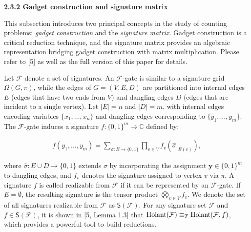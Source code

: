 



\par\medskip\noindent\textbf{
2.3.2 Gadget construction and signature matrix}\par




This subsection introduces two principal concepts in the study of counting problems: \emph{gadget construction} and the \emph{signature matrix}. Gadget construction is a critical reduction technique, and the signature matrix provides an algebraic representation bridging gadget construction with matrix multiplication. Please refer to [5] as well as the full version of this paper for details.\par




Let $\mathcal{F}$ denote a set of signatures. An $\mathcal{F}$-gate is similar to a signature grid $\Omega(G,\pi)$, while the edges of $G=(V,E,D)$ are partitioned into internal edges $E$ (edges that have two ends from $V$) and dangling edges $D$ (edges that are incident to a single vertex). Let $|E|=n$ and $|D|=m$, with internal edges encoding variables $\{x_{1},\ldots,x_{n}\}$ and dangling edges corresponding to $\{y_{1},\ldots,y_{m}\}$. The $\mathcal{F}$-gate induces a signature $f:\{0,1\}^{m}\to\mathbb{C}$ defined by:\par


\[\begin{gathered}
f(y_{1},\ldots,y_{m})=\sum_{\sigma:E\to\{0,1\}}\prod_{v\in V}f_{v}\left(\hat{\sigma}|_{E(v)}\right),
\end{gathered}\]


where $\hat{\sigma}:E\cup D\to\{0,1\}$ extends $\sigma$ by incorporating the assignment $\mathbf{y}\in\{0,1\}^{m}$ to dangling edges, and $f_{v}$ denotes the signature assigned to vertex $v$ via $\pi$. A signature $f$ is called realizable from $\mathcal{F}$ if it can be represented by an $\mathcal{F}$-gate. If $E=\emptyset$, the resulting signature is the tensor product $\bigotimes_{v\in V}f_{v}$. We denote the set of all signatures realizable from $\mathcal{F}$ as $\textsf{S}(\mathcal{F})$.
For any signature set $\mathcal{F}$ and $f\in\textsf{S}(\mathcal{F})$, it is shown in [5, Lemma 1.3] that $\textup{{Holant}}(\mathcal{F})\equiv_{T}\textup{{Holant}}(\mathcal{F},f)$, which provides a powerful tool to build reductions.\par




